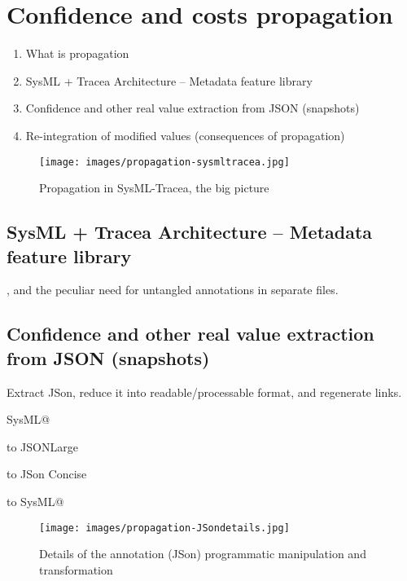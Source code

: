 \section{Confidence and costs propagation}\label{sec:reminder}


        \begin{enumerate}
            \item What is propagation
            \item SysML + Tracea Architecture -- Metadata feature library
            \item Confidence and other real value extraction from JSON (snapshots)
            \item Re-integration of modified values (consequences of propagation)
        \end{enumerate}

\begin{figure}[ht]     
	\centering
	\texttt{[image: images/propagation-sysmltracea.jpg]}
	\caption{Propagation in SysML-Tracea, the big picture}
	\label{fig:mm-core}
\end{figure}

\subsection{SysML + Tracea Architecture -- Metadata feature library}
, and the peculiar need for untangled annotations in separate files.




\subsection{Confidence and other real value extraction from JSON (snapshots)}
Extract JSon, reduce it into readable/processable format, and regenerate links.

SysML@ 

to JSONLarge 

to JSon Concise 

to SysML@


\begin{figure}[ht]     
	\centering
	\texttt{[image: images/propagation-JSondetails.jpg]}
	\caption{Details of the annotation (JSon) programmatic manipulation and transformation}
	\label{fig:ucmis}
\end{figure}



